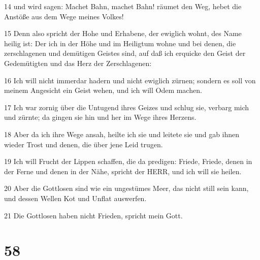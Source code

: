 \par 14 und wird sagen: Machet Bahn, machet Bahn! räumet den Weg, hebet die Anstöße aus dem Wege meines Volkes!
\par 15 Denn also spricht der Hohe und Erhabene, der ewiglich wohnt, des Name heilig ist: Der ich in der Höhe und im Heiligtum wohne und bei denen, die zerschlagenen und demütigen Geistes sind, auf daß ich erquicke den Geist der Gedemütigten und das Herz der Zerschlagenen:
\par 16 Ich will nicht immerdar hadern und nicht ewiglich zürnen; sondern es soll von meinem Angesicht ein Geist wehen, und ich will Odem machen.
\par 17 Ich war zornig über die Untugend ihres Geizes und schlug sie, verbarg mich und zürnte; da gingen sie hin und her im Wege ihres Herzens.
\par 18 Aber da ich ihre Wege ansah, heilte ich sie und leitete sie und gab ihnen wieder Trost und denen, die über jene Leid trugen.
\par 19 Ich will Frucht der Lippen schaffen, die da predigen: Friede, Friede, denen in der Ferne und denen in der Nähe, spricht der HERR, und ich will sie heilen.
\par 20 Aber die Gottlosen sind wie ein ungestümes Meer, das nicht still sein kann, und dessen Wellen Kot und Unflat auswerfen.
\par 21 Die Gottlosen haben nicht Frieden, spricht mein Gott.

\chapter{58}

